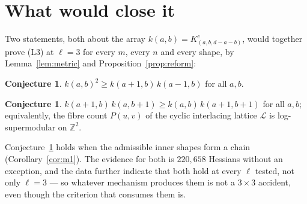 \documentclass[11pt]{article}
\theoremstyle{plain}
\theoremstyle{definition}
\newtheorem{conjecture}[theorem]{Conjecture}
\newcommand{\ZZ}{\mathbb{Z}}
\begin{document}
\section{What would close it}

Two statements, both about the array $k(a,b)=K^c_{(a,b,d-a-b)}$, would together prove
(L3) at $\ell=3$ for every $m$, every $n$ and every shape, by Lemma~\ref{lem:metric} and
Proposition~\ref{prop:reform}:
\begin{conjecture}\label{conj:A}
$k(a,b)^2\ge k(a+1,b)\,k(a-1,b)$ for all $a,b$.
\end{conjecture}
\begin{conjecture}\label{conj:B}
$k(a+1,b)\,k(a,b+1)\ge k(a,b)\,k(a+1,b+1)$ for all $a,b$; equivalently, the fibre count
$P(u,v)$ of the cyclic interlacing lattice $\mathcal{L}$ is log-supermodular on $\ZZ^2$.
\end{conjecture}
Conjecture~\ref{conj:B} holds when the admissible inner shapes form a chain
(Corollary~\ref{cor:m1}). The evidence for both is $220{,}658$ Hessians without an exception, and
the data further indicate that both hold at every $\ell$ tested, not only $\ell=3$ --- so whatever
mechanism produces them is not a $3\times3$ accident, even though the criterion that consumes them
is.
\end{document}

